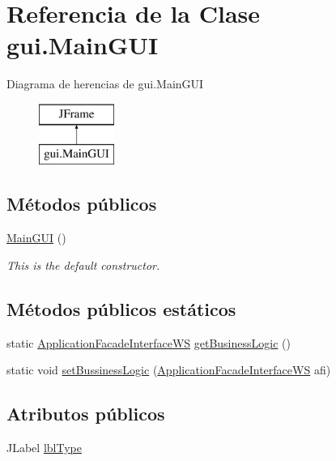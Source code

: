 \hypertarget{classgui_1_1_main_g_u_i}{}\section{Referencia de la Clase gui.\+Main\+G\+UI}
\label{classgui_1_1_main_g_u_i}
Diagrama de herencias de gui.\+Main\+G\+UI\begin{figure}[H]
\begin{center}
\leavevmode
\includegraphics[height=2.000000cm]{classgui_1_1_main_g_u_i}
\end{center}
\end{figure}
\subsection*{Métodos públicos}
\begin{DoxyCompactItemize}
\item 
\mbox{\hyperlink{classgui_1_1_main_g_u_i_a6968ef45452fe10bd544a46d6e099c32}{Main\+G\+UI}} ()
\begin{DoxyCompactList}\small\item\em This is the default constructor. \end{DoxyCompactList}\end{DoxyCompactItemize}
\subsection*{Métodos públicos estáticos}
\begin{DoxyCompactItemize}
\item 
static \mbox{\hyperlink{interfacebusiness_logic_1_1_application_facade_interface_w_s}{Application\+Facade\+Interface\+WS}} \mbox{\hyperlink{classgui_1_1_main_g_u_i_a037b3ca54b0c61d6899721ff55cca365}{get\+Business\+Logic}} ()
\item 
static void \mbox{\hyperlink{classgui_1_1_main_g_u_i_a306310290095fdaa31a668470fd6380d}{set\+Bussiness\+Logic}} (\mbox{\hyperlink{interfacebusiness_logic_1_1_application_facade_interface_w_s}{Application\+Facade\+Interface\+WS}} afi)
\end{DoxyCompactItemize}
\subsection*{Atributos públicos}
\begin{DoxyCompactItemize}
\item 
J\+Label \mbox{\hyperlink{classgui_1_1_main_g_u_i_a765a67a47cfcc50fd64e1ce0c2571c0d}{lbl\+Type}}
\end{DoxyCompactItemize}
